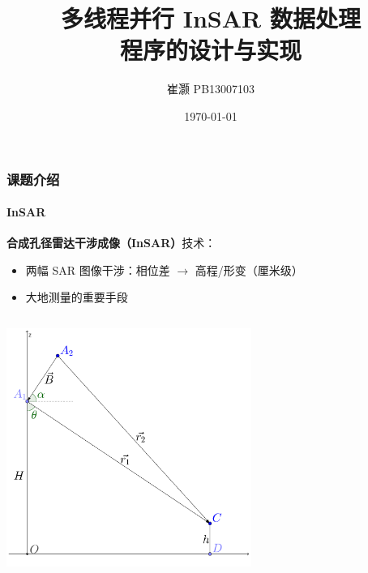\documentclass{beamer}
\title{多线程并行 InSAR 数据处理\\程序的设计与实现}
\author{崔灏 PB13007103}
\institute{中国科学技术大学\\地球和空间科学学院}
\date{\today}
\begin{document}
\frame{\titlepage}


\begin{frame}
    \frametitle{课题介绍}
    \framesubtitle{InSAR}

    \textbf{合成孔径雷达干涉成像（InSAR）}技术：
    \begin{itemize}
        \small
        \setlength\itemsep{-0.1em}
        \item 两幅 SAR 图像干涉：相位差 $\to$ 高程/形变（厘米级）
        \item 大地测量的重要手段
    \end{itemize}
 
    \begin{columns}
        \begin{column}{0.5\textwidth}
            \centering

            \includegraphics[width=0.6\textwidth]{figures/insar_simple.pdf}


\end{column}
\end{columns}
\end{frame}
\end{document}
